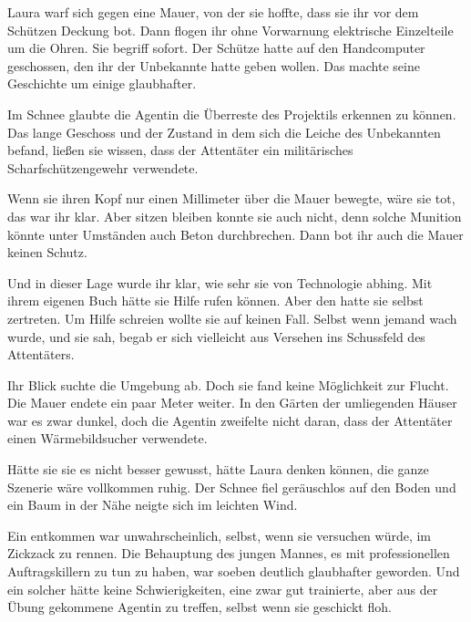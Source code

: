 \par

Laura warf sich gegen eine Mauer, von der sie hoffte, dass sie ihr vor dem Schützen Deckung bot. Dann flogen ihr ohne Vorwarnung elektrische Einzelteile um die Ohren. Sie begriff sofort. Der Schütze hatte auf den Handcomputer geschossen, den ihr der Unbekannte hatte geben wollen. Das machte seine Geschichte um einige glaubhafter.

\par

Im Schnee glaubte die Agentin die Überreste des Projektils erkennen zu können. Das lange Geschoss und der Zustand in dem sich die Leiche des Unbekannten befand, ließen sie wissen, dass der Attentäter ein militärisches Scharfschützengewehr verwendete.

\par

Wenn sie ihren Kopf nur einen Millimeter über die Mauer bewegte, wäre sie tot, das war ihr klar. Aber sitzen bleiben konnte sie auch nicht, denn solche Munition könnte unter Umständen auch Beton durchbrechen. Dann bot ihr auch die Mauer keinen Schutz.

\par

Und in dieser Lage wurde ihr klar, wie sehr sie von Technologie abhing. Mit ihrem eigenen Buch hätte sie Hilfe rufen können. Aber den hatte sie selbst zertreten. Um Hilfe schreien wollte sie auf keinen Fall. Selbst wenn jemand wach wurde, und sie sah, begab er sich vielleicht aus Versehen ins Schussfeld des Attentäters.

\par

Ihr Blick suchte die Umgebung ab. Doch sie fand keine Möglichkeit zur Flucht. Die Mauer endete ein paar Meter weiter. In den Gärten der umliegenden Häuser war es zwar dunkel, doch die Agentin zweifelte nicht daran, dass der Attentäter einen Wärmebildsucher verwendete.

\par

Hätte sie sie es nicht besser gewusst, hätte Laura denken können, die ganze Szenerie wäre vollkommen ruhig. Der Schnee fiel geräuschlos auf den Boden und ein Baum in der Nähe neigte sich im leichten Wind.

\par

Ein entkommen war unwahrscheinlich, selbst, wenn sie versuchen würde, im Zickzack zu rennen. Die Behauptung des jungen Mannes, es mit professionellen Auftragskillern zu tun zu haben, war soeben deutlich glaubhafter geworden. Und ein solcher hätte keine Schwierigkeiten, eine zwar gut trainierte, aber aus der Übung gekommene Agentin zu treffen, selbst wenn sie geschickt floh.

